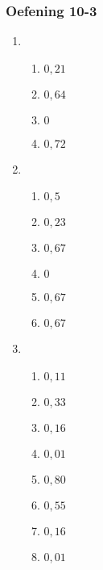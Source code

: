 {\begin{multicols}{3}
\subsubsection*{Oefening 10-3} %

\begin{enumerate}[noitemsep, label=\textbf{\arabic*}. ] 
\item %

    \begin{enumerate}[noitemsep, label=\textbf{(\alph*)} ]
	  \item $0,21$%
	  \item $0,64$%
	  \item $0$%
	  \item $0,72$%
    \end{enumerate}

\item %


      \begin{enumerate}[noitemsep, label=\textbf{(\alph*)} ]
	  \item $0,5$%
	  \item $0,23$%
	  \item $0,67$%
	  \item $0$%
	  \item $0,67$%
	  \item $0,67$%
      \end{enumerate}
\item
      \begin{enumerate}[noitemsep, label=\textbf{(\alph*)} ]
	  \item $0,11$%
	  \item $0,33$%
	  \item $0,16$%
	  \item $0,01$%
	  \item $0,80$%
	  \item $0,55$%
	  \item $0,16$%
	  \item $0,01$%
      \end{enumerate}


\end{enumerate}
\end{multicols}}
